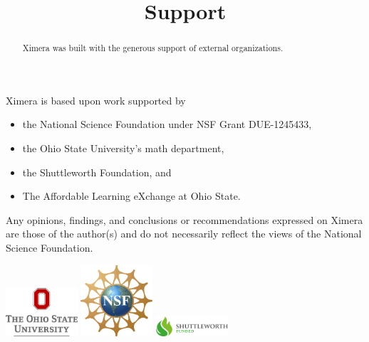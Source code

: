 \documentclass{ximera}
\title{Support}
\begin{document}
\begin{abstract}
  Ximera was built with the generous support of external organizations.
\end{abstract}
\maketitle

Ximera is based upon work supported by
\begin{itemize}
\item %
the National Science Foundation under NSF Grant DUE-1245433,
\item %
the Ohio State University's math department,
\item %
the Shuttleworth Foundation, and
\item The Affordable Learning eXchange at Ohio State.
\end{itemize}

Any opinions, findings, and conclusions or recommendations expressed on Ximera are those of the author(s) and do not necessarily reflect the views of the National Science Foundation.

\begin{center}
\includegraphics[align=c,width=0.2\textwidth]{sponsors/osu.png}
\includegraphics[align=c,width=0.2\textwidth]{sponsors/nsf.png}
\includegraphics[align=c,width=0.2\textwidth]{sponsors/shuttleworth.png}
\end{center}
\end{document}
